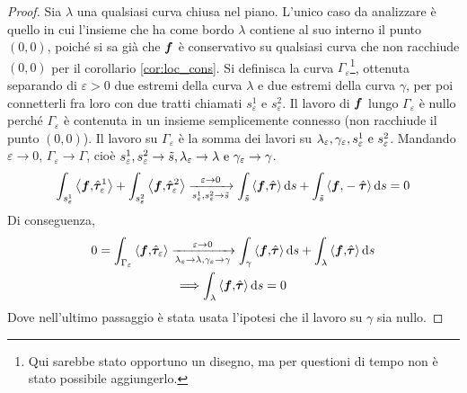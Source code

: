 \begin{proof}
	Sia $\lambda$ una qualsiasi curva chiusa nel piano. L'unico caso da analizzare è quello in cui l'insieme che ha come bordo $\lambda$ contiene al suo interno il punto $(0,0)$, poiché si sa già che $\bm f$ è conservativo su qualsiasi curva che non racchiude $(0,0)$ per il corollario \ref{cor:loc_cons}. Si definisca la curva $\Gamma_\varepsilon$\footnote{Qui sarebbe stato opportuno un disegno, ma per questioni di tempo non è stato possibile aggiungerlo.}, ottenuta separando di $\varepsilon>0$ due estremi della curva $\lambda$ e due estremi della curva $\gamma$, per poi connetterli fra loro con due tratti chiamati $s_\varepsilon^1$ e $s_\varepsilon^2$. Il lavoro di $\bm f$ lungo $\Gamma_\varepsilon$ è nullo perché $\Gamma_\varepsilon$ è contenuta in un insieme semplicemente connesso (non racchiude il punto $(0,0)$). Il lavoro su $\Gamma_\varepsilon$ è la somma dei lavori su $\lambda_\varepsilon,\gamma_\varepsilon,s_\varepsilon^1 \text{ e } s_\varepsilon^2$. Mandando $\varepsilon \to 0$, $\Gamma_\varepsilon \to \Gamma$, cioè $s_\varepsilon^1,s_\varepsilon^2\to \tilde{s}, \lambda_\varepsilon \to \lambda \text{ e } \gamma_\varepsilon \to \gamma$.
	$$
		\int_{s_{\varepsilon}^1}\left\langle\bm f{,}\hat{\bm\tau}_\varepsilon^1\right\rangle+\int_{s_{\varepsilon}^2}\left\langle\bm f{,}\hat{\bm\tau}_\varepsilon^2\right\rangle
		\xrightarrow[s_\varepsilon^1,s_\varepsilon^2\to \tilde{s}]{\varepsilon\to 0}
		\int_{\tilde{s}}\left\langle\bm f{,}\hat{\bm\tau}\right\rangle\dd s+\int_{\tilde{s}}\left\langle\bm f{,}-\hat{\bm\tau}\right\rangle\dd s=0
	$$
	Di conseguenza,
	\begin{gather*}
		0=\int_{\Gamma_\varepsilon}\left\langle\bm f{,}\hat{\bm\tau}_\varepsilon\right\rangle\xrightarrow[\lambda_\varepsilon\to\lambda,\gamma_\varepsilon\to\gamma]
		{\varepsilon\to 0}\int_\gamma \left\langle\bm f{,}\hat{\bm\tau}\right\rangle\dd s+\int_\lambda\left\langle\bm f{,}\hat{\bm\tau}\right\rangle\dd s\\
		\Longrightarrow \int_\lambda \left\langle\bm f{,}\hat{\bm\tau}\right\rangle\dd s=0
	\end{gather*}
	Dove nell'ultimo passaggio è stata usata l'ipotesi che il lavoro su $\gamma$ sia nullo.
\end{proof}